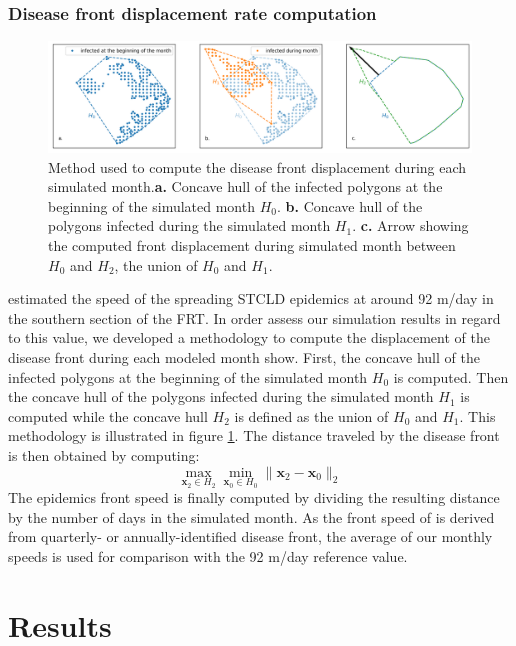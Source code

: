 \documentclass[utf8]{frontiersSCNS}
\begin{document}
\subsubsection{Disease front displacement rate computation}
\begin{figure}
    \centering
    \includegraphics[width=.95\textwidth]{figures/hull_example.png}
    \caption{Method used to compute the disease front displacement during each simulated month.\textbf{a.} Concave hull of the infected polygons at the beginning of the simulated month $H_0$. \textbf{b.} Concave hull of the polygons infected during the simulated month $H_1$. \textbf{c.} Arrow showing the computed front displacement during simulated month between $H_0$ and $H_2$, the union of $H_0$ and $H_1$.}
    \label{fig:hull}
\end{figure}
\citep{muller2020spatial} estimated the speed of the spreading STCLD epidemics at around 92 m/day in the southern section of the FRT. In order assess our simulation results in regard to this value, we developed a methodology to compute the displacement of the disease front during each modeled month show. First, the concave hull of the infected polygons at the beginning of the simulated month $H_0$ is computed. Then the concave hull of the polygons infected during the simulated month $H_1$ is computed while the concave hull $H_2$ is defined as the union of $H_0$ and $H_1$. This methodology is illustrated in figure \ref{fig:hull}. The distance traveled by the disease front is then obtained by computing:
\begin{equation}
    \max\limits_{\mathbf{x}_2\in H_2}\min\limits_{\mathbf{x}_0\in H_0} \|\mathbf{x}_2 - \mathbf{x}_0\|_2
\end{equation}
The epidemics front speed is finally computed by dividing the resulting distance by the number of days in the simulated month. As the front speed of \citep{muller2020spatial} is derived from quarterly- or annually-identified disease front, the average of our monthly speeds is used for comparison with the 92 m/day reference value.

\section{Results}
\end{document}
